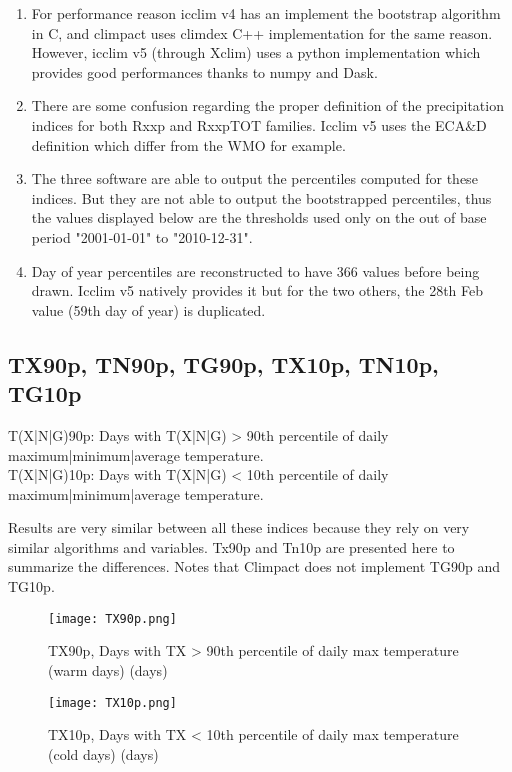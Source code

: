 \documentclass[a4paper,11pt]{article}
\begin{document}
    \begin{enumerate}
        \item For performance reason icclim v4 has an implement the bootstrap algorithm in C, and climpact uses climdex C++ implementation for the same reason. However, icclim v5 (through Xclim) uses a python implementation which provides good performances thanks to numpy and Dask.
        \item There are some confusion regarding the proper definition of the precipitation indices for both Rxxp and RxxpTOT families. Icclim v5 uses the ECA\&D definition which differ from the WMO for example.
        \item The three software are able to output the percentiles computed for these indices. But they are not able to output the bootstrapped percentiles, thus the values displayed below are the thresholds used only on the out of base period "2001-01-01" to "2010-12-31".
        \item Day of year percentiles are reconstructed to have 366 values before being drawn. Icclim v5 natively provides it but for the two others, the 28th Feb value (59th day of year) is duplicated. 
    \end{enumerate}


\subsection{TX90p, TN90p, TG90p, TX10p, TN10p, TG10p}
    T(X|N|G)90p: Days with T(X|N|G) > 90th percentile of daily maximum|minimum|average temperature.\\
    T(X|N|G)10p: Days with T(X|N|G) < 10th percentile of daily maximum|minimum|average temperature.

    Results are very similar between all these indices because they rely on very similar algorithms and variables. Tx90p and Tn10p are presented here to summarize the differences.
    Notes that Climpact does not implement TG90p and TG10p.

    \begin{figure}[!hbt]
        \centering
        \texttt{[image: TX90p.png]}
        \caption{TX90p, Days with TX > 90th percentile of daily max temperature (warm
        days) (days)}
        \label{figure/tx90p}
    \end{figure}

    \begin{figure}[!hbt]
        \centering
        \texttt{[image: TX10p.png]}
        \caption{TX10p, Days with TX < 10th percentile of daily max temperature (cold days) (days)}
        \label{figure/tx10p}
    \end{figure}
\end{document}

